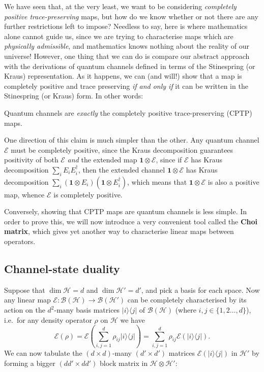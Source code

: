 \documentclass[fleqn]{article}
\newenvironment{idea}{\noindent}{\medskip}
\begin{document}
We have seen that, at the very least, we want to be considering \emph{completely positive trace-preserving} maps, but how do we know whether or not there are any further restrictions left to impose?
Needless to say, here is where mathematics alone cannot guide us, since we are trying to characterise maps which are \emph{physically admissible}, and mathematics knows nothing about the reality of our universe!
However, one thing that we can do is compare our abstract approach with the derivations of quantum channels defined in terms of the Stinespring (or Kraus) representation.
As it happens, we can (and will!) show that a map is completely positive and trace preserving \emph{if and only if} it can be written in the Stinespring (or Kraus) form.
In other words:

\begin{idea}
Quantum channels are \emph{exactly} the completely positive trace-preserving (CPTP) maps.

\end{idea}

One direction of this claim is much simpler than the other.
Any quantum channel \(\mathcal{E}\) must be completely positive, since the Kraus decomposition guarantees positivity of both \(\mathcal{E}\) \emph{and} the extended map \(\mathbf{1}\otimes\mathcal{E}\), since if \(\mathcal{E}\) has Kraus decomposition \(\sum_i E_i E_i^\dagger\), then the extended channel \(\mathbf{1}\otimes\mathcal{E}\) has Kraus decomposition \(\sum_i(\mathbf{1}\otimes E_i)(\mathbf{1}\otimes E_i^\dagger)\), which means that \(\mathbf{1}\otimes\mathcal{E}\) is also a positive map, whence \(\mathcal{E}\) is completely positive.

Conversely, showing that CPTP maps are quantum channels is less simple.
In order to prove this, we will now introduce a very convenient tool called the \textbf{Choi matrix}, which gives yet another way to characterise linear maps between operators.

\hypertarget{channel-state-duality}{%
\subsection{Channel-state duality}\label{channel-state-duality}}

Suppose that \(\dim\mathcal{H}=d\) and \(\dim\mathcal{H}'=d'\), and pick a basis for each space.
Now any linear map \(\mathcal{E}\colon\mathcal{B}(\mathcal{H})\to\mathcal{B}(\mathcal{H'})\) can be completely characterised by its action on the \(d^2\)-many basis matrices \(|i\rangle\langle j|\) of \(\mathcal{B}(\mathcal{H})\) (where \(i,j\in\{1,2\ldots,d\}\)), i.e.~for any density operator \(\rho\) on \(\mathcal{H}\) we have
\[
  \mathcal{E}(\rho)
  = \mathcal{E}\left(\sum_{i,j=1}^d\rho_{ij} |i\rangle\langle j|\right)
  = \sum_{i,j=1}^d\rho_{ij}\mathcal{E}(|i\rangle\langle j|).
\tag{$\natural$}
\]
We can now tabulate the \((d\times d)\)-many \((d'\times d')\) matrices \(\mathcal{E}(|i\rangle\langle j|)\) in \(\mathcal{H}'\) by forming a bigger \((dd'\times dd')\) block matrix in \(\mathcal{H}\otimes\mathcal{H}'\):
\end{document}
